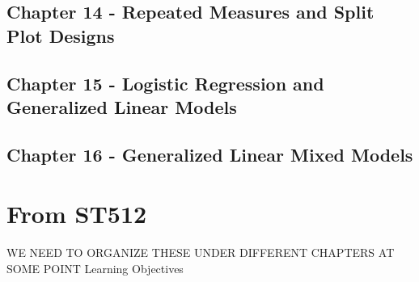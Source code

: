\documentclass[]{book}
\theoremstyle{definition}
\theoremstyle{definition}
\theoremstyle{definition}
\theoremstyle{remark}
\begin{document}
\subsection{Chapter 14 - Repeated Measures and Split Plot
Designs}\label{chapter-14---repeated-measures-and-split-plot-designs}

\subsection{Chapter 15 - Logistic Regression and Generalized Linear
Models}\label{chapter-15---logistic-regression-and-generalized-linear-models}

\subsection{Chapter 16 - Generalized Linear Mixed
Models}\label{chapter-16---generalized-linear-mixed-models}

\section{From ST512}\label{from-st512}

WE NEED TO ORGANIZE THESE UNDER DIFFERENT CHAPTERS AT SOME POINT
Learning Objectives
\end{document}
